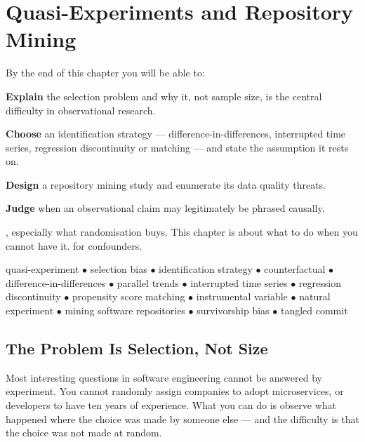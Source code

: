 \chapter{Quasi-Experiments and Repository Mining}\label{ch:quasiexp}

\begin{outcomes}
By the end of this chapter you will be able to:
\begin{tight}
  \item \textbf{Explain} the selection problem and why it, not sample size, is
    the central difficulty in observational research.
  \item \textbf{Choose} an identification strategy --- difference-in-differences,
    interrupted time series, regression discontinuity or matching --- and state
    the assumption it rests on.
  \item \textbf{Design} a repository mining study and enumerate its data
    quality threats.
  \item \textbf{Judge} when an observational claim may legitimately be phrased
    causally.
\end{tight}
\end{outcomes}

\begin{prereq}
, especially what randomisation buys. This chapter is about
what to do when you cannot have it.  for confounders.
\end{prereq}

\begin{keyterms}
quasi-experiment $\bullet$ selection bias $\bullet$ identification strategy
$\bullet$ counterfactual $\bullet$ difference-in-differences $\bullet$ parallel
trends $\bullet$ interrupted time series $\bullet$ regression discontinuity
$\bullet$ propensity score matching $\bullet$ instrumental variable $\bullet$
natural experiment $\bullet$ mining software repositories $\bullet$
survivorship bias $\bullet$ tangled commit
\end{keyterms}

\section{The Problem Is Selection, Not Size}

Most interesting questions in software engineering cannot be answered by
experiment. You cannot randomly assign companies to adopt microservices, or
developers to have ten years of experience. What you can do is observe what
happened where the choice was made by someone else --- and the difficulty is
that the choice was not made at random.

